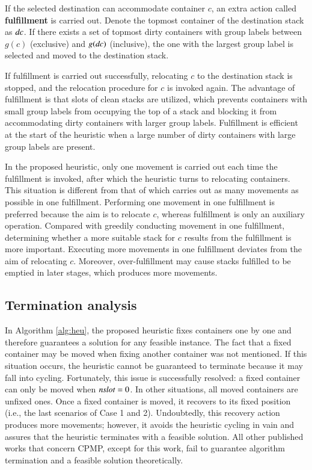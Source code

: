 \documentclass[review,3p,times,authoryear,12pt]{elsarticle}
\begin{document}
If the selected destination can accommodate container $c$, an extra action called \textbf{fulfillment} is carried out. Denote the topmost container of the destination stack as $\id{dc}$. If there exists a set of topmost dirty containers with group labels between $g(c)$ (exclusive) and $g(\id{dc})$ (inclusive), the one with the largest group label is selected and moved to the destination stack.

If fulfillment is carried out successfully, relocating $c$ to the destination stack is stopped, and the relocation procedure for $c$ is invoked again. The advantage of fulfillment is that slots of clean stacks are utilized, which prevents containers with small group labels from occupying the top of a stack and blocking it from accommodating dirty containers with larger group labels. Fulfillment is efficient at the start of the heuristic when a large number of dirty containers with large group labels are present.

In the proposed heuristic, only one movement is carried out each time the fulfillment is invoked, after which the heuristic turns to relocating containers. This situation is different from that of \cite{Exposito2012} which carries out as many movements as possible in one fulfillment. Performing one movement in one fulfillment is preferred because the aim is to relocate $c$, whereas fulfillment is only an auxiliary operation. Compared with greedily conducting movement in one fulfillment, determining whether a more suitable stack for $c$ results from the fulfillment is more important. Executing more movements in one fulfillment deviates from the aim of relocating $c$. Moreover, over-fulfillment may cause stacks fulfilled to be emptied in later stages, which produces more movements.

\subsection{Termination analysis}

In Algorithm \ref{alg:heu}, the proposed heuristic fixes containers one by one and therefore guarantees a solution for any feasible instance. The fact that a fixed container may be moved when fixing another container was not mentioned.
If this situation occurs, the heuristic cannot be guaranteed to terminate because it may fall into cycling. Fortunately, this issue is successfully resolved: a fixed container can only be moved when $\id{nslot}=0$.
In other situations, all moved containers are unfixed ones. Once a fixed container is moved, it recovers to its fixed position (i.e., the last scenarios of Case 1 and 2).
Undoubtedly, this recovery action produces more movements; however, it avoids the heuristic cycling in vain and assures that the heuristic terminates with a feasible solution.
All other published works that concern CPMP, except for this work, fail to guarantee algorithm termination and a feasible solution theoretically.
\end{document}
